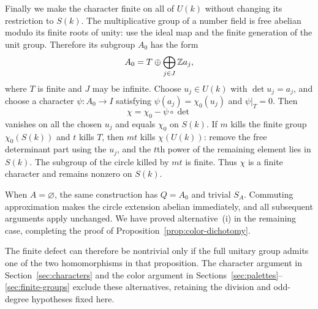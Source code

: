 Finally we make the character finite on all of $U(k)$ without changing
its restriction to $S(k)$.  The multiplicative group of a number field
is free abelian modulo its finite roots of unity: use the ideal map and
the finite generation of the unit group.  Therefore its subgroup $A_0$
has the form
\[
 A_0=T\oplus\bigoplus_{j\in J}\mathbb Z a_j,
\]
where $T$ is finite and $J$ may be infinite.  Choose $u_j\in U(k)$
with $\det u_j=a_j$, and choose a character $\psi:A_0\to I$ satisfying
$\psi(a_j)=\chi_0(u_j)$ and $\psi|_T=0$.  Then
\[
 \chi=\chi_0-\psi\circ\det
\]
vanishes on all the chosen $u_j$ and equals $\chi_0$ on $S(k)$.
If $m$ kills the finite group $\chi_0(S(k))$ and $t$ kills $T$, then
$mt$ kills $\chi(U(k))$: remove the free determinant part using the
$u_j$, and the $t$th power of the remaining element lies in $S(k)$.
The subgroup of the circle killed by $mt$ is finite.  Thus $\chi$ is a
finite character and remains nonzero on $S(k)$.

When $A=\varnothing$, the same construction has $Q=A_0$ and trivial
$S_A$.  Commuting approximation makes the circle extension abelian
immediately, and all subsequent arguments apply unchanged.  We have
proved alternative~\textup{(i)} in the remaining case, completing the
proof of Proposition~\ref{prop:color-dichotomy}.

The finite defect can therefore be nontrivial only if the full unitary
group admits one of the two homomorphisms in that proposition.  The
character argument in Section~\ref{sec:characters} and the color argument
in Sections~\ref{sec:palettes}--\ref{sec:finite-groups} exclude these
alternatives, retaining the division and odd-degree hypotheses fixed here.

